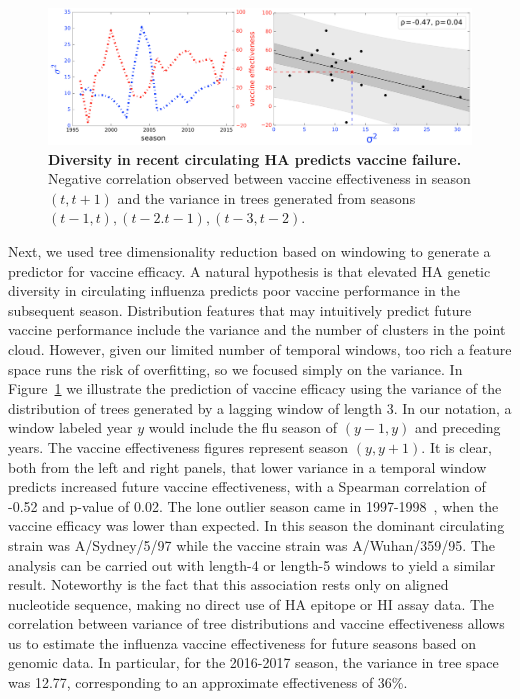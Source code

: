 \documentclass[a4paper,11pt]{article}
\begin{document}
\begin{figure}
    \centering
    \includegraphics[width=\linewidth]{../figures/influenza_VE.png}
    \caption{{\bf Diversity in recent circulating HA predicts vaccine failure.} Negative correlation observed between vaccine effectiveness in season $(t, t+1)$ and the variance in trees generated from seasons $(t-1,t), (t-2. t-1), (t-3,t-2)$.}
    \label{fig:flu_VE}
\end{figure}

Next, we used tree dimensionality reduction based on windowing to generate a predictor for vaccine efficacy.
A natural hypothesis is that elevated HA genetic diversity in circulating influenza predicts poor vaccine performance in the subsequent season.
Distribution features that may intuitively predict future vaccine performance include the variance and the number of clusters in the point cloud.
However, given our limited number of temporal windows, too rich a feature space runs the risk of overfitting, so we focused simply on the variance.
In Figure~\ref{fig:flu_VE} we illustrate the prediction of vaccine efficacy using the variance of the distribution of trees generated by a lagging window of length 3.
In our notation, a window labeled year $y$ would include the flu season of $(y-1, y)$ and preceding years.
The vaccine effectiveness figures represent season $(y, y+1).$
It is clear, both from the left and right panels, that lower variance in a temporal window predicts increased future vaccine effectiveness, with a Spearman correlation of -0.52 and p-value of 0.02.
The lone outlier season came in 1997-1998~\cite{gupta2006quantifying}, when the vaccine efficacy was lower than expected.
In this season the dominant circulating strain was A/Sydney/5/97 while the vaccine strain was A/Wuhan/359/95.
The analysis can be carried out with length-4 or length-5 windows to yield a similar result.
Noteworthy is the fact that this association rests only on aligned nucleotide sequence, making no direct use of HA epitope or HI assay data.
The correlation between variance of tree distributions and vaccine effectiveness allows us to estimate the influenza vaccine effectiveness for future seasons based on genomic data.
In particular, for the 2016-2017 season, the variance in tree space was 12.77, corresponding to an approximate effectiveness of 36\%.
\end{document}

